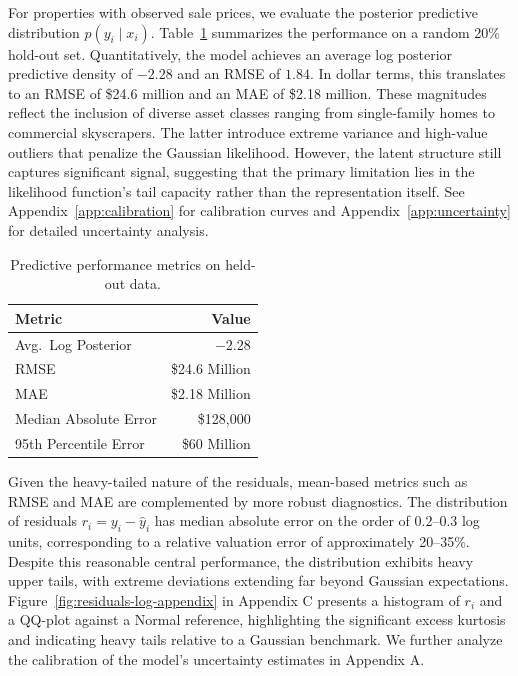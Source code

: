 \documentclass{article}
\begin{document}
For properties with observed sale prices, we evaluate the posterior predictive distribution $p(y_i \mid x_i)$. Table~\ref{tab:global-metrics} summarizes the performance on a random 20\% hold-out set. Quantitatively, the model achieves an average log posterior predictive density of $-2.28$ and an RMSE of $1.84$. In dollar terms, this translates to an RMSE of \$24.6 million and an MAE of \$2.18 million. These magnitudes reflect the inclusion of diverse asset classes ranging from single-family homes to commercial skyscrapers. The latter introduce extreme variance and high-value outliers that penalize the Gaussian likelihood. However, the latent structure still captures significant signal, suggesting that the primary limitation lies in the likelihood function's tail capacity rather than the representation itself. See Appendix~\ref{app:calibration} for calibration curves and Appendix~\ref{app:uncertainty} for detailed uncertainty analysis.

\begin{table}[t]
    \centering
    \begin{tabular}{lr}
        \toprule
        Metric & Value \\
        \midrule
        Avg.\ Log Posterior & $-2.28$ \\
        RMSE & \$24.6 Million \\
        MAE & \$2.18 Million \\
        Median Absolute Error & \$128,000 \\
        95th Percentile Error & \$60 Million \\
        \bottomrule
    \end{tabular}
    \caption{Predictive performance metrics on held-out data.}
    \label{tab:global-metrics}
\end{table}

Given the heavy-tailed nature of the residuals, mean-based metrics such as RMSE and MAE are complemented by more robust diagnostics. The distribution of residuals $r_i = y_i - \hat{y}_i$ has median absolute error on the order of $0.2$--$0.3$ log units, corresponding to a relative valuation error of approximately 20--35\%. Despite this reasonable central performance, the distribution exhibits heavy upper tails, with extreme deviations extending far beyond Gaussian expectations. Figure~\ref{fig:residuals-log-appendix} in Appendix C presents a histogram of $r_i$ and a QQ-plot against a Normal reference, highlighting the significant excess kurtosis and indicating heavy tails relative to a Gaussian benchmark. We further analyze the calibration of the model's uncertainty estimates in Appendix A.
\end{document}
